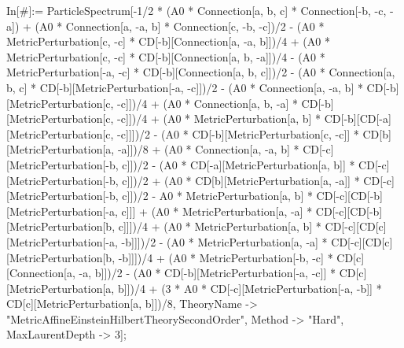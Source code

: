 In[\#]:= ParticleSpectrum[-1/2 * (A0 * Connection[a, b, c] * Connection[-b, -c, -a]) + (A0 * Connection[a, -a, b] * Connection[c, -b, -c])/2 - (A0 * MetricPerturbation[c, -c] * CD[-b][Connection[a, -a, b]])/4 + (A0 * MetricPerturbation[c, -c] * CD[-b][Connection[a, b, -a]])/4 - (A0 * MetricPerturbation[-a, -c] * CD[-b][Connection[a, b, c]])/2 - (A0 * Connection[a, b, c] * CD[-b][MetricPerturbation[-a, -c]])/2 - (A0 * Connection[a, -a, b] * CD[-b][MetricPerturbation[c, -c]])/4 + (A0 * Connection[a, b, -a] * CD[-b][MetricPerturbation[c, -c]])/4 + (A0 * MetricPerturbation[a, b] * CD[-b][CD[-a][MetricPerturbation[c, -c]]])/2 - (A0 * CD[-b][MetricPerturbation[c, -c]] * CD[b][MetricPerturbation[a, -a]])/8 + (A0 * Connection[a, -a, b] * CD[-c][MetricPerturbation[-b, c]])/2 - (A0 * CD[-a][MetricPerturbation[a, b]] * CD[-c][MetricPerturbation[-b, c]])/2 + (A0 * CD[b][MetricPerturbation[a, -a]] * CD[-c][MetricPerturbation[-b, c]])/2 - A0 * MetricPerturbation[a, b] * CD[-c][CD[-b][MetricPerturbation[-a, c]]] + (A0 * MetricPerturbation[a, -a] * CD[-c][CD[-b][MetricPerturbation[b, c]]])/4 + (A0 * MetricPerturbation[a, b] * CD[-c][CD[c][MetricPerturbation[-a, -b]]])/2 - (A0 * MetricPerturbation[a, -a] * CD[-c][CD[c][MetricPerturbation[b, -b]]])/4 + (A0 * MetricPerturbation[-b, -c] * CD[c][Connection[a, -a, b]])/2 - (A0 * CD[-b][MetricPerturbation[-a, -c]] * CD[c][MetricPerturbation[a, b]])/4 + (3 * A0 * CD[-c][MetricPerturbation[-a, -b]] * CD[c][MetricPerturbation[a, b]])/8, TheoryName -> "MetricAffineEinsteinHilbertTheorySecondOrder", Method -> "Hard", MaxLaurentDepth -> 3]; 